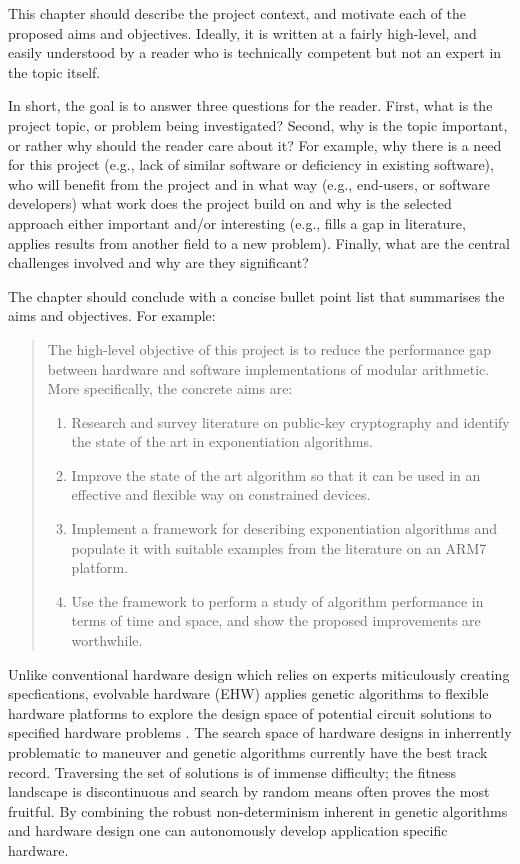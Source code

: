 {
\color{red}
\noindent
This chapter should describe the project context, and motivate each of
the proposed aims and objectives.  Ideally, it is written at a fairly
high-level, and easily understood by a reader who is technically
competent but not an expert in the topic itself.

In short, the goal is to answer three questions for the reader.  First,
what is the project topic, or problem being investigated?  Second, why
is the topic important, or rather why should the reader care about it?
For example, why there is a need for this project (e.g., lack of similar
software or deficiency in existing software), who will benefit from the
project and in what way (e.g., end-users, or software developers) what
work does the project build on and why is the selected approach either
important and/or interesting (e.g., fills a gap in literature, applies
results from another field to a new problem).  Finally, what are the
central challenges involved and why are they significant?

The chapter should conclude with a concise bullet point list that
summarises the aims and objectives.  For example:

\begin{quote}
\noindent
The high-level objective of this project is to reduce the performance
gap between hardware and software implementations of modular arithmetic.
More specifically, the concrete aims are:

\begin{enumerate}
\item Research and survey literature on public-key cryptography and
      identify the state of the art in exponentiation algorithms.
\item Improve the state of the art algorithm so that it can be used
      in an effective and flexible way on constrained devices.
\item Implement a framework for describing exponentiation algorithms
      and populate it with suitable examples from the literature on
      an ARM7 platform.
\item Use the framework to perform a study of algorithm performance
      in terms of time and space, and show the proposed improvements
      are worthwhile.
\end{enumerate}
\end{quote}
}

Unlike conventional hardware design which relies on experts miticulously creating
specfications, evolvable hardware (EHW) applies genetic algorithms to
flexible hardware platforms to explore the design space of potential
circuit solutions to specified hardware problems \cite{541893}.
The search space of hardware designs in inherrently problematic to maneuver and
genetic algorithms currently have the best track record.
Traversing the set of solutions is of immense difficulty; the fitness landscape
is discontinuous and
search by random means often proves the most fruitful. By combining
the robust non-determinism inherent in genetic algorithms and hardware design
one can autonomously develop application specific hardware.

